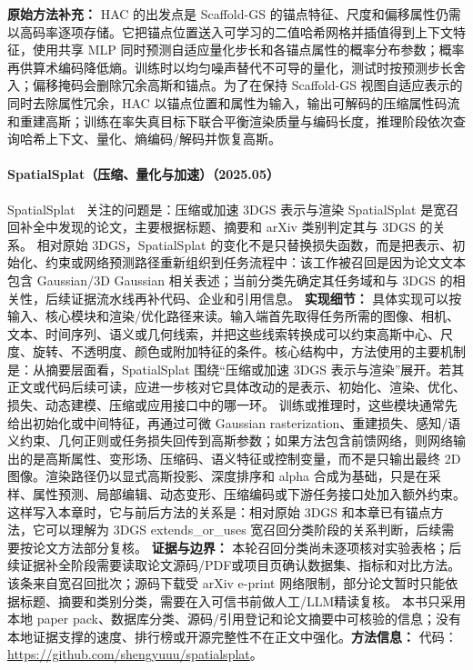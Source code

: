 \textbf{原始方法补充：} HAC 的出发点是 Scaffold-GS 的锚点特征、尺度和偏移属性仍需以高码率逐项存储。它把锚点位置送入可学习的二值哈希网格并插值得到上下文特征，使用共享 MLP 同时预测自适应量化步长和各锚点属性的概率分布参数；概率再供算术编码降低熵。训练时以均匀噪声替代不可导的量化，测试时按预测步长舍入；偏移掩码会删除冗余高斯和锚点。为了在保持 Scaffold-GS 视图自适应表示的同时去除属性冗余，HAC 以锚点位置和属性为输入，输出可解码的压缩属性码流和重建高斯；训练在率失真目标下联合平衡渲染质量与编码长度，推理阶段依次查询哈希上下文、量化、熵编码/解码并恢复高斯。
\paragraph{SpatialSplat（压缩、量化与加速）（2025.05）}
SpatialSplat~\cite{2505_23044} 关注的问题是：压缩或加速 3DGS 表示与渲染 SpatialSplat 是宽召回补全中发现的论文，主要根据标题、摘要和 arXiv 类别判定其与 3DGS 的关系。
相对原始 3DGS，SpatialSplat 的变化不是只替换损失函数，而是把表示、初始化、约束或网络预测路径重新组织到任务流程中：该工作被召回是因为论文文本包含 Gaussian/3D Gaussian 相关表述；当前分类先确定其任务域和与 3DGS 的相关性，后续证据流水线再补代码、企业和引用信息。
\textbf{实现细节：} 具体实现可以按输入、核心模块和渲染/优化路径来读。输入端首先取得任务所需的图像、相机、文本、时间序列、语义或几何线索，并把这些线索转换成可以约束高斯中心、尺度、旋转、不透明度、颜色或附加特征的条件。核心结构中，方法使用的主要机制是：从摘要层面看，SpatialSplat 围绕“压缩或加速 3DGS 表示与渲染”展开。若其正文或代码后续可读，应进一步核对它具体改动的是表示、初始化、渲染、优化、损失、动态建模、压缩或应用接口中的哪一环。 训练或推理时，这些模块通常先给出初始化或中间特征，再通过可微 Gaussian rasterization、重建损失、感知/语义约束、几何正则或任务损失回传到高斯参数；如果方法包含前馈网络，则网络输出的是高斯属性、变形场、压缩码、语义特征或控制变量，而不是只输出最终 2D 图像。渲染路径仍以显式高斯投影、深度排序和 alpha 合成为基础，只是在采样、属性预测、局部编辑、动态变形、压缩编码或下游任务接口处加入额外约束。这样写入本章时，它与前后方法的关系是：相对原始 3DGS 和本章已有锚点方法，它可以理解为 3DGS extends\_or\_uses 宽召回分类阶段的关系判断，后续需要按论文方法部分复核。
\textbf{证据与边界：} 本轮召回分类尚未逐项核对实验表格；后续证据补全阶段需要读取论文源码/PDF或项目页确认数据集、指标和对比方法。 该条来自宽召回批次；源码下载受 arXiv e-print 网络限制，部分论文暂时只能依据标题、摘要和类别分类，需要在入可信书前做人工/LLM精读复核。 本书只采用本地 paper pack、数据库分类、源码/引用登记和论文摘要中可核验的信息；没有本地证据支撑的速度、排行榜或开源完整性不在正文中强化。\textbf{方法信息：} 代码：\url{https://github.com/shengyuuu/spatialsplat}。
